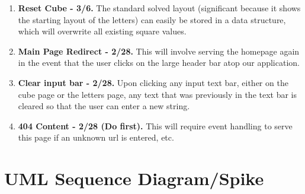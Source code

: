 \documentclass[12pt]{article}
\begin{document}
\begin{enumerate}
	\item \textbf{Reset Cube - 3/6.} The standard solved layout (significant because it shows the starting layout of the letters) can easily be stored in a data structure, which will overwrite all existing square values.
	\item \textbf{Main Page Redirect - 2/28.} This will involve serving the homepage again in the event that the user clicks on the large header bar atop our application.
	\item \textbf{Clear input bar - 2/28.} Upon clicking any input text bar, either on the cube page or the letters page, any text that was previously in the text bar is cleared so that the user can enter a new string.
	\item \textbf{404 Content - 2/28 (Do first).} This will require event handling to serve this page if an unknown url is entered, etc. 
\end{enumerate}

\section{UML Sequence Diagram/Spike}
\end{document}
